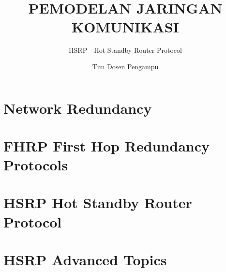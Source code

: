 \documentclass[pdflatex,compress,mathserif]{beamer}
\title{PEMODELAN JARINGAN KOMUNIKASI}
\subtitle{HSRP - Hot Standby Router Protocol}
\author{Tim Dosen Pengampu}
\begin{document}
	
\maketitle

\section{Network Redundancy}

\section{FHRP First Hop Redundancy Protocols}

\section{HSRP Hot Standby Router Protocol}

\section{HSRP Advanced Topics}
\end{document}
